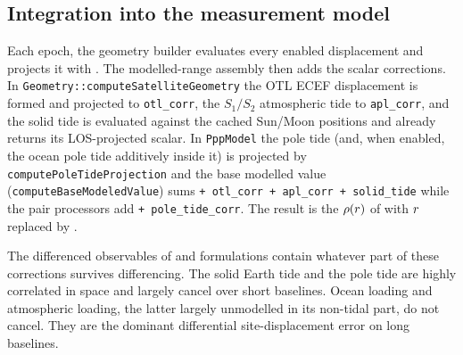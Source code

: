 \documentclass[main.tex]{subfiles}
\begin{document}
\subsection{Integration into the measurement model}
\label{sec:sitedisp-integration}

Each epoch, the geometry builder evaluates every enabled displacement
and projects it with .  The modelled-range
assembly then adds the scalar corrections.  In
\texttt{Geometry::computeSatelliteGeometry} the OTL ECEF displacement is
formed and projected to \texttt{otl\_corr}, the $S_1/S_2$ atmospheric
tide to \texttt{apl\_corr}, and the solid tide is evaluated against the
cached Sun/Moon positions and already returns its LOS-projected scalar.
In \texttt{PppModel} the pole tide (and, when
enabled, the ocean pole tide additively inside it) is projected by
\texttt{computePoleTideProjection} and the base
modelled value (\texttt{computeBaseModeledValue}) sums
\texttt{+ otl\_corr + apl\_corr + solid\_tide}
while the pair processors add
\texttt{+ pole\_tide\_corr}.  The result is the $\rho(r)$ of
 with $r$ replaced by
.

The differenced observables of  and
 formulations contain whatever part of
these corrections survives differencing.  The solid Earth tide and the
pole tide are highly correlated in space and largely cancel over short
baselines.  Ocean loading and atmospheric loading, the latter largely
unmodelled in its non-tidal part, do not cancel.  They are the dominant
differential site-displacement error on long baselines.

\ifSubfilesClassLoaded{\printbibliography}{}
\end{document}

